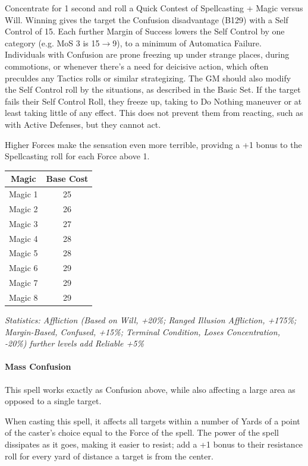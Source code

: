 \begin{multicols}{3}
	Concentrate for 1 second and roll a Quick Contest of Spellcasting + Magic versus Will. Winning gives the target the Confusion disadvantage (B129) with a Self Control of 15. Each further Margin of Success lowers the Self Control by one category (e.g. MoS 3 is 15$\rightarrow$9), to a minimum of Automatica Failure. Individuals with Confusion are prone freezing up under strange places, during commotions, or whenever there's a need for deicisive action, which often preculdes any Tactics rolls or similar strategizing. The GM should also modify the Self Control roll by the situations, as described in the Basic Set. If the target fails their Self Control Roll, they freeze up, taking to Do Nothing maneuver or at least taking little of any effect. This does not prevent them from reacting, such as with Active Defenses, but they cannot act.
	
	Higher Forces make the sensation even more terrible, providng a +1 bonus to the Spellcasting roll for each Force above 1.
	
	\begin{center}
		\begin{tabular}{|c|c|}
			\hline
			Magic & Base Cost \\
			\hline
			\hline
			Magic 1 & 25 \\
			Magic 2 & 26 \\
			Magic 3 & 27 \\
			Magic 4 & 28 \\
			Magic 5 & 28 \\
			Magic 6 & 29 \\
			Magic 7 & 29 \\
			Magic 8 & 29 \\
			\hline
		\end{tabular}
	\end{center}

	\textcolor{OliveGreen}{\textit{Statistics: Affliction (Based on Will, +20\%; Ranged Illusion Affliction, +175\%; Margin-Based, Confused, +15\%; Terminal Condition, Loses Concentration, -20\%)  further levels add Reliable +5\%}}
	
	\paragraph{Mass Confusion}
	
	This spell works exactly as Confusion above, while also affecting a large area as opposed to a single target.
	
	When casting this spell, it affects all targets within a number of Yards of a point of the caster's choice equal to the Force of the spell. The power of the spell dissipates as it goes, making it easier to resist; add a +1 bonus to their resistance roll for every yard of distance a target is from the center.
	

\end{multicols}
